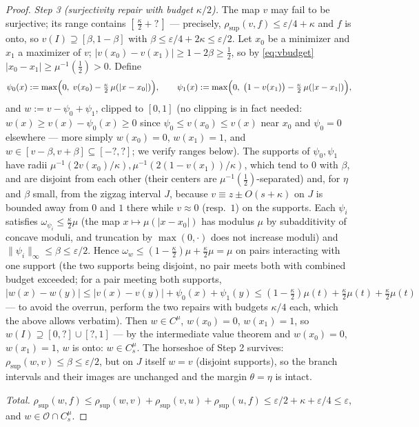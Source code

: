 \documentclass[11pt]{article}
\newcommand{\I}{I}
\newcommand{\rsup}{\rho_{\sup}}
\begin{document}
\begin{proof}
\emph{Step 3 (surjectivity repair with budget $\kappa/2$).}  The map $v$ may fail
to be surjective; its range contains
$[\,\tfrac\kappa2+\!?\,]$ --- precisely, $\rsup(v,f)\le\varepsilon/4+\kappa$ and
$f$ is onto, so $v(\I)\supseteq[\beta,1-\beta]$ with
$\beta\le\varepsilon/4+2\kappa\le\varepsilon/2$.  Let $x_0$ be a minimizer and
$x_1$ a maximizer of $v$; $|v(x_0)-v(x_1)|\ge1-2\beta\ge\tfrac12$, so by
\eqref{eq:vbudget} $|x_0-x_1|\ge\mu^{-1}(\tfrac12)>0$.  Define
\[
\psi_0(x):=\max\Bigl(0,\;v(x_0)-\tfrac\kappa2\,\mu(|x-x_0|)\Bigr),
\qquad
\psi_1(x):=\max\Bigl(0,\;\bigl(1-v(x_1)\bigr)-\tfrac\kappa2\,\mu(|x-x_1|)\Bigr),
\]
and $w:=v-\psi_0+\psi_1$, clipped to $[0,1]$ (no clipping is in fact needed:
$w(x)\ge v(x)-\psi_0(x)\ge0$ since $\psi_0\le v(x_0)\le v(x)$ near $x_0$ and
$\psi_0=0$ elsewhere --- more simply $w(x_0)=0$, $w(x_1)=1$, and
$w\in[v-\beta,v+\beta]\subseteq[-?,?]$; we verify ranges below).  The supports of
$\psi_0,\psi_1$ have radii $\mu^{-1}(2v(x_0)/\kappa),\mu^{-1}(2(1-v(x_1))/\kappa)$,
which tend to $0$ with $\beta$, and are disjoint from each other (their centers
are $\mu^{-1}(\tfrac12)$-separated) and, for $\eta$ and $\beta$ small, from the
zigzag interval $J$, because $v\equiv z\pm O(s+\kappa)$ on $J$ is bounded away
from $0$ and $1$ there while $v\approx0$ (resp.\ $1$) on the supports.  Each
$\psi_i$ satisfies $\omega_{\psi_i}\le\tfrac\kappa2\mu$ (the map
$x\mapsto\mu(|x-x_0|)$ has modulus $\mu$ by subadditivity of concave moduli, and
truncation by $\max(0,\cdot)$ does not increase moduli) and
$\|\psi_i\|_\infty\le\beta\le\varepsilon/2$.  Hence
$\omega_w\le(1-\tfrac\kappa2)\mu+\tfrac\kappa2\mu=\mu$ on pairs interacting with
one support (the two supports being disjoint, no pair meets both with combined
budget exceeded; for a pair meeting both supports,
$|w(x)-w(y)|\le|v(x)-v(y)|+\psi_0(x)+\psi_1(y)\le(1-\tfrac\kappa2)\mu(t)+
\tfrac\kappa2\mu(t)+\tfrac\kappa2\mu(t)$ --- to avoid the overrun, perform the
two repairs with budgets $\kappa/4$ each, which the above allows verbatim).
Then $w\in C^\mu$, $w(x_0)=0$, $w(x_1)=1$, so
$w(\I)\supseteq[0,?]\cup[?,1]$ --- by the intermediate value theorem and
$w(x_0)=0$, $w(x_1)=1$, $w$ is onto: $w\in C^\mu_s$.  The horseshoe of Step 2
survives: $\rsup(w,v)\le\beta\le\varepsilon/2$, but on $J$ itself
$w=v$ (disjoint supports), so the branch intervals and their images are
unchanged and the margin $\theta=\eta$ is intact.

\emph{Total.}  $\rsup(w,f)\le\rsup(w,v)+\rsup(v,u)+\rsup(u,f)
\le\varepsilon/2+\kappa+\varepsilon/4\le\varepsilon$, and
$w\in\mathcal O\cap C^\mu_s$.
\end{proof}
\end{document}
